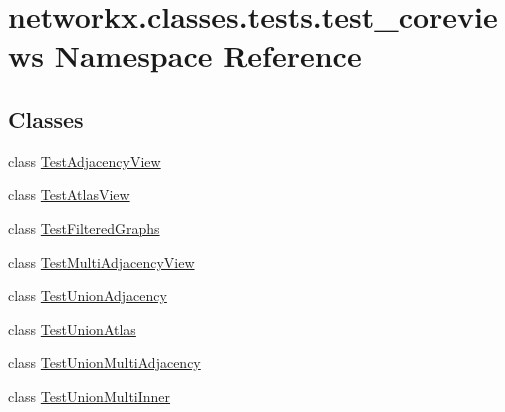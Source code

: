 \hypertarget{namespacenetworkx_1_1classes_1_1tests_1_1test__coreviews}{}\section{networkx.\+classes.\+tests.\+test\+\_\+coreviews Namespace Reference}
\label{namespacenetworkx_1_1classes_1_1tests_1_1test__coreviews}
\subsection*{Classes}
\begin{DoxyCompactItemize}
\item 
class \hyperlink{classnetworkx_1_1classes_1_1tests_1_1test__coreviews_1_1TestAdjacencyView}{Test\+Adjacency\+View}
\item 
class \hyperlink{classnetworkx_1_1classes_1_1tests_1_1test__coreviews_1_1TestAtlasView}{Test\+Atlas\+View}
\item 
class \hyperlink{classnetworkx_1_1classes_1_1tests_1_1test__coreviews_1_1TestFilteredGraphs}{Test\+Filtered\+Graphs}
\item 
class \hyperlink{classnetworkx_1_1classes_1_1tests_1_1test__coreviews_1_1TestMultiAdjacencyView}{Test\+Multi\+Adjacency\+View}
\item 
class \hyperlink{classnetworkx_1_1classes_1_1tests_1_1test__coreviews_1_1TestUnionAdjacency}{Test\+Union\+Adjacency}
\item 
class \hyperlink{classnetworkx_1_1classes_1_1tests_1_1test__coreviews_1_1TestUnionAtlas}{Test\+Union\+Atlas}
\item 
class \hyperlink{classnetworkx_1_1classes_1_1tests_1_1test__coreviews_1_1TestUnionMultiAdjacency}{Test\+Union\+Multi\+Adjacency}
\item 
class \hyperlink{classnetworkx_1_1classes_1_1tests_1_1test__coreviews_1_1TestUnionMultiInner}{Test\+Union\+Multi\+Inner}
\end{DoxyCompactItemize}
